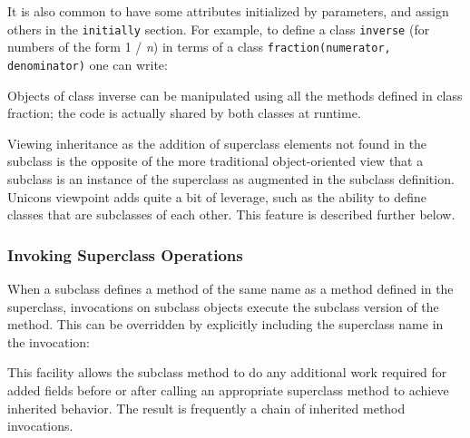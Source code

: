 
\noindent
It is also common to have some attributes initialized by parameters, and
assign others in the \texttt{initially} section. For example, to define a
class \texttt{inverse} (for numbers of the form 1 / \textit{n}) in terms
of a class \texttt{fraction(numerator, denominator)} one can write: 


Objects of class inverse can be manipulated using all the methods
defined in class fraction; the code is actually shared by both classes
at runtime. 

Viewing inheritance as the addition of superclass elements not found in
the subclass is the opposite of the more traditional object-oriented
view that a subclass is an instance of the
superclass as augmented in the subclass definition.
Unicon{\textquotesingle}s viewpoint adds quite a bit of leverage, such
as the ability to define classes that are subclasses of each other.
This feature is described further below. 

\subsubsection[Invoking Superclass Operations]{Invoking Superclass
Operations}

When a subclass defines a
method of the same name as a method defined in the superclass,
invocations on subclass objects execute the
subclass{\textquotesingle} version of the
method. This can be overridden by explicitly
including the superclass name in the invocation: 


This facility allows the subclass method to do any additional work
required for added fields before or after calling an appropriate
superclass method to achieve inherited behavior. The result is
frequently a chain of inherited method invocations. 

